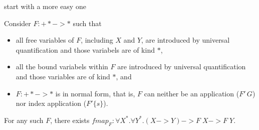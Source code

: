 start with a more easy one
\begin{proposition}
Consider $F : +* -> *$ such that
\begin{itemize}
	\item all free variables of $F$, including $X$ and $Y$,
		are introduced by universal quantification
		and those variabels are of kind $*$,
	\item all the bound variabels within $F$ are
		introduced by universal quantification
		and those variables are of kind $*$, and
	\item $F : +* -> *$ is in normal form, that is, $F$ can neither be
		an application ($F'\,G$) nor index application ($F'\{s\}$).
\end{itemize}
For any such $F$, there exists 
$\textit{fmap}_F : \forall X^{*}.\forall Y^{*}.(X -> Y) -> F\;X -> F\;Y$.
\end{proposition}
